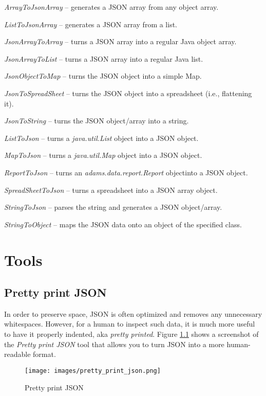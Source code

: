 \documentclass[a4paper]{book}
\begin{document}
\begin{tight_itemize}
	\item \textit{ArrayToJsonArray} -- generates a JSON array from any object	array.
	\item \textit{ListToJsonArray} -- generates a JSON array from a list.
	\item \textit{JsonArrayToArray} -- turns a JSON array into a regular Java	object array.
	\item \textit{JsonArrayToList} -- turns a JSON array into a regular Java list.
	\item \textit{JsonObjectToMap} -- turns the JSON object into a simple Map.
	\item \textit{JsonToSpreadSheet} -- turns the JSON object into a spreadsheet (i.e., flattening it).
	\item \textit{JsonToString} -- turns the JSON object/array into a string.
	\item \textit{ListToJson} -- turns a \textit{java.util.List} object	into a JSON object.
	\item \textit{MapToJson} -- turns a \textit{java.util.Map} object	into a JSON object.
	\item \textit{ReportToJson} -- turns an \textit{adams.data.report.Report} objectinto a JSON object.
	\item \textit{SpreadSheetToJson} -- turns a spreadsheet into a JSON array object.
	\item \textit{StringToJson} -- parses the string and generates a JSON object/array.
	\item \textit{StringToObject} -- maps the JSON data onto an object of the specified class.
\end{tight_itemize}

\chapter{Tools}

\section{Pretty print JSON}
In order to preserve space, JSON is often optimized and removes any unnecessary
whitespaces. However, for a human to inspect such data, it is much more useful
to have it properly indented, aka \textit{pretty printed}. Figure \ref{pretty_print_json}
shows a screenshot of the \textit{Pretty print JSON} tool that allows you to
turn JSON into a more human-readable format.
\begin{figure}[htb]
  \centering
  \texttt{[image: images/pretty\_print\_json.png]}
  \caption{Pretty print JSON}
  \label{pretty_print_json}
\end{figure}
\end{document}
